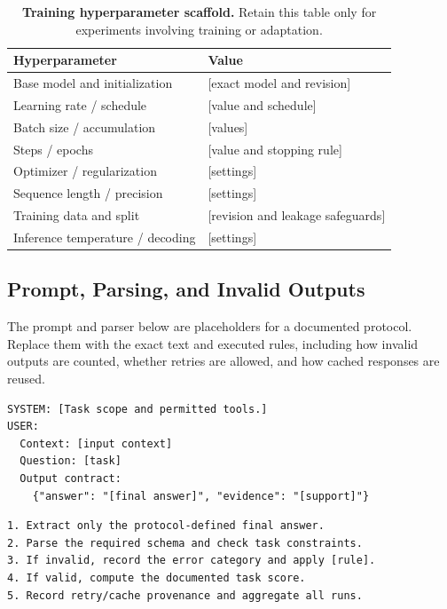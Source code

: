 \begin{table}[htbp]
\centering
\caption{\textbf{Training hyperparameter scaffold.} Retain this table only for experiments involving training or adaptation.}
\label{tab:hyperparameters}
\small
\begin{tabularx}{.88\textwidth}{@{}lY@{}}
\toprule
Hyperparameter & Value\\
\midrule
Base model and initialization & [exact model and revision]\\
Learning rate / schedule & [value and schedule]\\
Batch size / accumulation & [values]\\
Steps / epochs & [value and stopping rule]\\
Optimizer / regularization & [settings]\\
Sequence length / precision & [settings]\\
Training data and split & [revision and leakage safeguards]\\
Inference temperature / decoding & [settings]\\
\bottomrule
\end{tabularx}
\end{table}

\subsection{Prompt, Parsing, and Invalid Outputs}
\label{app:protocol}

The prompt and parser below are placeholders for a documented protocol. Replace them with the exact text and executed rules, including how invalid outputs are counted, whether retries are allowed, and how cached responses are reused.

\begin{lstlisting}[caption={Prompt-format scaffold.},label={lst:prompt}]
SYSTEM: [Task scope and permitted tools.]
USER:
  Context: [input context]
  Question: [task]
  Output contract:
    {"answer": "[final answer]", "evidence": "[support]"}
\end{lstlisting}

\begin{lstlisting}[caption={Evaluation-rule scaffold; describe the actual parser.},label={lst:parser}]
1. Extract only the protocol-defined final answer.
2. Parse the required schema and check task constraints.
3. If invalid, record the error category and apply [rule].
4. If valid, compute the documented task score.
5. Record retry/cache provenance and aggregate all runs.
\end{lstlisting}

